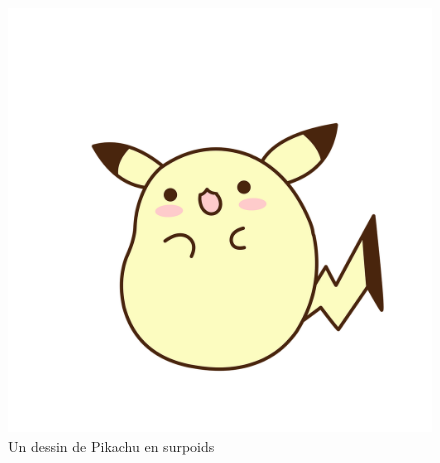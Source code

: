 \documentclass[../main.tex]{subfiles}
\begin{document}
\begin{figure}[h]
  \centering
  \includegraphics[width=\textwidth,height=0.4\textheight,keepaspectratio]{images/pokemons/pikachu_gros}
  \captionsetup{font=small,labelfont=bf, justification=centering}
  \caption{Un dessin de Pikachu en surpoids}
  \label{fig:pikachu_gros}
\end{figure}
\end{document}
